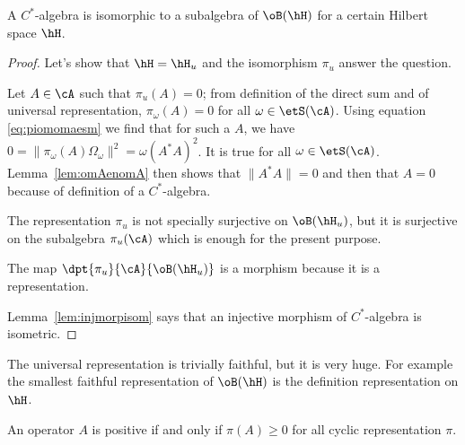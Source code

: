 \begin{theorem}
	A $C^*$-algebra is isomorphic to a subalgebra of $\oB(\hH)$ for a certain Hilbert space $\hH$.
\end{theorem}

\begin{proof}
	Let's show that $\hH=\hH_u$ and the isomorphism $\pi_u$ answer the question.

	Let $A\in\cA$ such that $\pi_u(A)=0$; from definition of the direct sum and of universal representation,  $\pi_{\omega}(A)=0$ for all $\omega\in\etS(\cA)$. Using equation \eqref{eq:piomomaesm} we find that for such a $A$, we have $0=\| \pi_{\omega}(A)\Omega_{\omega} \|^2=\omega(A^*A)^2$. It is true for all $\omega\in\etS(\cA)$. Lemma~\ref{lem:omAenomA} then shows that $\| A^*A \|=0$ and then that $A=0$ because of definition of a $C^*$-algebra.

	The representation $\pi_u$ is not specially surjective on $\oB(\hH_u)$, but it is surjective on the subalgebra $\pi_u(\cA)$ which is enough for the present purpose.

	The map $\dpt{\pi_u}{\cA}{\oB(\hH_u)}$ is a morphism because it is a representation.


	Lemma~\ref{lem:injmorpisom} says that an injective morphism of $C^*$-algebra is isometric.

\end{proof}

The universal representation is trivially faithful, but it is very huge. For example the smallest faithful representation of $\oB(\hH)$ is the definition representation on $\hH$.

\begin{corollary}
	An operator $A$ is positive if and only if $\pi(A)\geq 0$ for all cyclic representation $\pi$.
\end{corollary}

